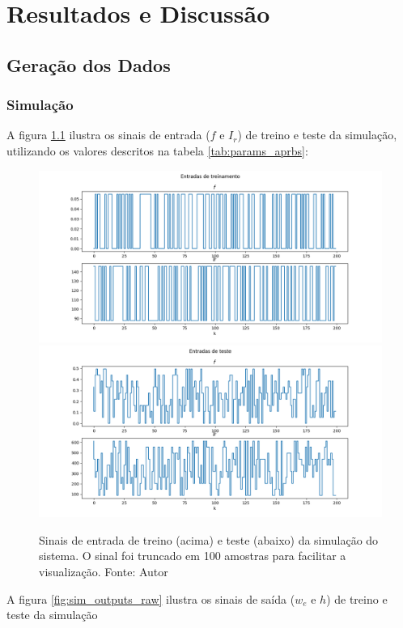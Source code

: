 \chapter{Resultados e Discussão}
\label{chap4}
\section{Geração dos Dados}
\subsection{Simulação}
A figura \ref{fig:sim_inputs_raw} ilustra os sinais de entrada ($f$ e $I_r$) de treino e teste da simulação, utilizando os valores descritos na tabela \ref{tab:params_aprbs}:

\begin{figure}[hbt!]
    \centering
    \includegraphics[width=0.8\linewidth]{Imagens/chap04/simulation_inputs_train_raw.png}
    \hfill
    \includegraphics[width=0.8\linewidth]{Imagens/chap04/simulation_inputs_test_raw.png}
    \caption{Sinais de entrada de treino (acima) e teste (abaixo) da simulação do sistema. O sinal foi truncado em 100 amostras para facilitar a visualização. Fonte: Autor}
    \label{fig:sim_inputs_raw}
\end{figure}

A figura \ref{fig:sim_outputs_raw} ilustra os sinais de saída ($w_e$ e $h$) de treino e teste da simulação

